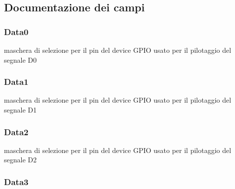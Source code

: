 \subsection{Documentazione dei campi}
\hypertarget{struct_h_d44780___l_c_d__t_aed1ef3393be1a14aa7b2644585e5bb08}{
\subsubsection[{Data0}]{ Data0}}\label{struct_h_d44780___l_c_d__t_aed1ef3393be1a14aa7b2644585e5bb08}
maschera di selezione per il pin del device G\+P\+I\+O usato per il pilotaggio del segnale D0 \hypertarget{struct_h_d44780___l_c_d__t_a9b310a22b76c920feb015a3a3084b125}{
\subsubsection[{Data1}]{ Data1}}\label{struct_h_d44780___l_c_d__t_a9b310a22b76c920feb015a3a3084b125}
maschera di selezione per il pin del device G\+P\+I\+O usato per il pilotaggio del segnale D1 \hypertarget{struct_h_d44780___l_c_d__t_afb22274224118a94688f1809cda55501}{
\subsubsection[{Data2}]{ Data2}}\label{struct_h_d44780___l_c_d__t_afb22274224118a94688f1809cda55501}
maschera di selezione per il pin del device G\+P\+I\+O usato per il pilotaggio del segnale D2 \hypertarget{struct_h_d44780___l_c_d__t_ae6f2e7b5a4aa8b82451e021f2f5b3a89}{
\subsubsection[{Data3}]{ Data3}}\label{struct_h_d44780___l_c_d__t_ae6f2e7b5a4aa8b82451e021f2f5b3a89}
